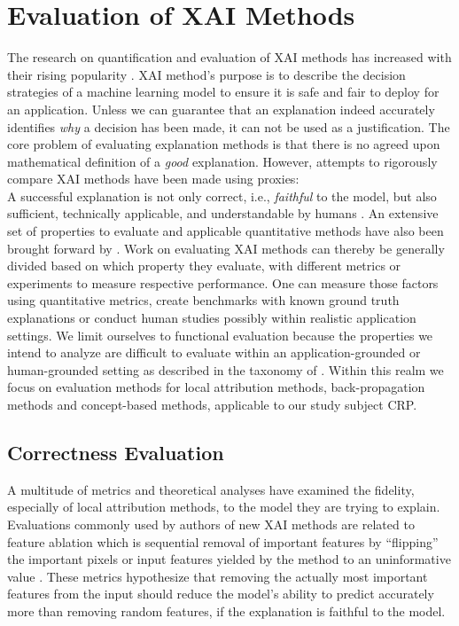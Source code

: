 \section{Evaluation of XAI Methods}
The research on quantification and evaluation of XAI methods has increased with their rising popularity \citep{Nauta2023}. 
XAI method's purpose is to describe the decision strategies of a machine learning model to ensure it is safe and fair to deploy for an application. 
Unless we can guarantee that an explanation indeed accurately identifies \textit{why} a decision has been made, it can not be used as a justification.
The core problem of evaluating explanation methods is that there is no agreed upon mathematical definition of a \textit{good} explanation. However, attempts to rigorously compare XAI methods have been made using proxies:\\
A successful explanation is not only correct, i.e., \textit{faithful} to the model, but also sufficient, technically applicable, and understandable by humans \citep{Samek2021}. An extensive set of properties to evaluate and applicable quantitative methods have also been brought forward by \cite{Nauta2023}. Work on evaluating XAI methods can thereby be generally divided based on which property they evaluate, with different metrics or experiments to measure respective performance. One can measure those factors using quantitative metrics, create benchmarks with known ground truth explanations or conduct human studies possibly within realistic application settings. We limit ourselves to functional evaluation because the properties we intend to analyze are difficult to evaluate within an application-grounded or human-grounded setting as described in the taxonomy of \cite{Nauta2023}. Within this realm we focus on evaluation methods for local attribution methods, back-propagation methods and concept-based methods, applicable to our study subject CRP. 

\subsection{Correctness Evaluation}
A multitude of metrics and theoretical analyses have examined the fidelity, especially of local attribution methods, to the model they are trying to explain. Evaluations commonly used by authors of new XAI methods are related to feature ablation which is sequential removal of important features by ``flipping'' the important pixels or input features yielded by the method to an uninformative value \citep{Samek2017a}. 
These metrics hypothesize that removing the actually most important features from the input should reduce the model's ability to predict accurately more than removing random features, if the explanation is faithful to the model.

